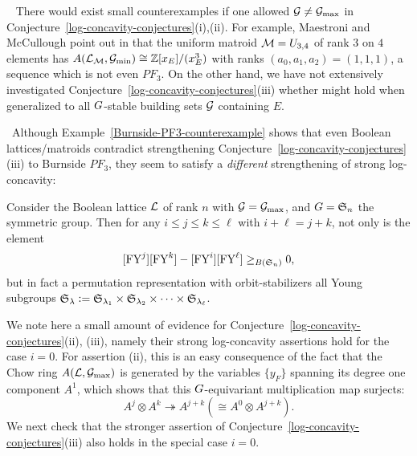 \begin{remark} \rm \
\label{PF-needs-max-building-set}
There would exist small counterexamples if one allowed $\mathcal{G} \neq \mathcal{G}_{\max}$ in Conjecture~\ref{log-concavity-conjectures}(i),(ii).  For example, 
Maestroni and McCullough point out in
\cite[Ex.~6.3]{MaestroniMcCullough} that the uniform matroid $\mathcal{M}=U_{3,4}$ of rank $3$ on $4$ elements has
$A(\mathcal{L}_{\mathcal{M}},\mathcal{G}_{\min}) \cong \mathbb{Z}[x_E]/(x_E^3)$ with ranks $(a_0,a_1,a_2)=(1,1,1)$, a sequence which is not even $PF_3$.  On the other hand,
we have not extensively investigated Conjecture~\ref{log-concavity-conjectures}(iii) whether might hold when generalized to all $G$-stable
building sets $\mathcal{G}$ containing $E$.
\end{remark}

\begin{remark} \rm  \ 
Although Example~\ref{Burnside-PF3-counterexample} shows that even Boolean lattices/matroids contradict strengthening
Conjecture~\ref{log-concavity-conjectures}(iii) to Burnside $PF_3$, they seem to satisfy a {\it different} strengthening of strong log-concavity:

\begin{conj}
\label{boolean-h-log-concavity-conj}
Consider the Boolean lattice $\mathcal{L}$ of rank $n$ with $\mathcal{G}=\mathcal{G}_{\max}$, and $G=\mathfrak{S}_n$ the symmetric group.  Then for any $i \leq j \leq k \leq \ell$ with  $i+\ell=j+k$, not only is the element
$$
[\mathrm{FY}^j][\mathrm{FY}^k]-[\mathrm{FY}^i][\mathrm{FY}^\ell] \geq_{B(\mathfrak{S}_n)} 0,
$$
but in fact a permutation representation with 
orbit-stabilizers all Young subgroups
$\mathfrak{S}_\lambda:=\mathfrak{S}_{\lambda_1} \times \mathfrak{S}_{\lambda_2} \times \cdots \times \mathfrak{S}_{\lambda_\ell}$.
\end{conj}
\end{remark}



We note here a small amount of evidence for Conjecture~\ref{log-concavity-conjectures}(ii), (iii), namely their strong log-concavity assertions
hold for the case
$i=0$. For assertion (ii), this is an easy consequence
of the fact that the Chow ring $A(\mathcal{L},\mathcal{G}_{\max})$ is generated by the variables $\{ y_F \}$ spanning its degree one component $A^1$, which shows that this $G$-equivariant multiplication map surjects:
\begin{equation}
\label{multiplication-surjects}
A^j \otimes A^k  \twoheadrightarrow  A^{j+k} \left(\cong A^0 \otimes A^{j+k}\right).
\end{equation}
We next check that the
stronger assertion of Conjecture~\ref{log-concavity-conjectures}(iii) also holds in the special case $i=0$.

